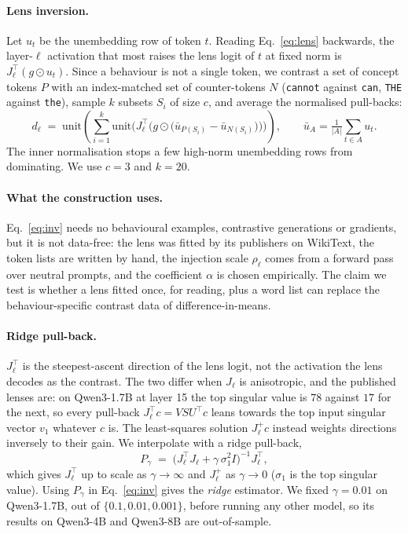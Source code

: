 \documentclass{article}
\begin{document}
\paragraph{Lens inversion.}
Let $u_t$ be the unembedding row of token $t$. Reading Eq.~\ref{eq:lens} backwards, the layer-$\ell$ activation that most raises the lens logit of $t$ at fixed norm is $J_\ell^\top (g \odot u_t)$. Since a behaviour is not a single token, we contrast a set of concept tokens $P$ with an index-matched set of counter-tokens $N$ (\texttt{cannot} against \texttt{can}, \texttt{THE} against \texttt{the}), sample $k$ subsets $S_i$ of size $c$, and average the normalised pull-backs:
\begin{equation}
  d_\ell \;=\; \mathrm{unit}\!\left(\sum_{i=1}^{k} \mathrm{unit}\Big(J_\ell^\top \Big(g \odot \big(\bar u_{P(S_i)} - \bar u_{N(S_i)}\big)\Big)\Big)\right),
  \qquad
  \bar u_A = \tfrac{1}{|A|}\!\sum_{t \in A}\!u_t .
  \label{eq:inv}
\end{equation}
The inner normalisation stops a few high-norm unembedding rows from dominating. We use $c = 3$ and $k = 20$.

\paragraph{What the construction uses.}
Eq.~\ref{eq:inv} needs no behavioural examples, contrastive generations or gradients, but it is not data-free: the lens was fitted by its publishers on WikiText, the token lists are written by hand, the injection scale $\rho_\ell$ comes from a forward pass over neutral prompts, and the coefficient $\alpha$ is chosen empirically. The claim we test is whether a lens fitted once, for reading, plus a word list can replace the behaviour-specific contrast data of difference-in-means.

\paragraph{Ridge pull-back.}
$J_\ell^\top$ is the steepest-ascent direction of the lens logit, not the activation the lens decodes as the contrast. The two differ when $J_\ell$ is anisotropic, and the published lenses are: on Qwen3-1.7B at layer 15 the top singular value is $78$ against $17$ for the next, so every pull-back $J_\ell^\top c = V S U^\top c$ leans towards the top input singular vector $v_1$ whatever $c$ is. The least-squares solution $J_\ell^{+} c$ instead weights directions inversely to their gain. We interpolate with a ridge pull-back,
\begin{equation}
  P_\gamma \;=\; \big(J_\ell^\top J_\ell + \gamma\,\sigma_1^2 I\big)^{-1} J_\ell^\top ,
  \label{eq:ridge}
\end{equation}
which gives $J_\ell^\top$ up to scale as $\gamma \to \infty$ and $J_\ell^{+}$ as $\gamma \to 0$ ($\sigma_1$ is the top singular value). Using $P_\gamma$ in Eq.~\ref{eq:inv} gives the \emph{ridge} estimator. We fixed $\gamma = 0.01$ on Qwen3-1.7B, out of $\{0.1, 0.01, 0.001\}$, before running any other model, so its results on Qwen3-4B and Qwen3-8B are out-of-sample.
\end{document}
